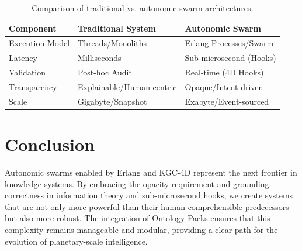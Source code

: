 \begin{table}[h]
\centering
\begin{tabular}{|l|l|l|}
\hline
\textbf{Component} & \textbf{Traditional System} & \textbf{Autonomic Swarm} \\
\hline
Execution Model & Threads/Monoliths & Erlang Processes/Swarm \\
Latency & Milliseconds & Sub-microsecond (Hooks) \\
Validation & Post-hoc Audit & Real-time (4D Hooks) \\
Transparency & Explainable/Human-centric & Opaque/Intent-driven \\
Scale & Gigabyte/Snapshot & Exabyte/Event-sourced \\
\hline
\end{tabular}
\caption{Comparison of traditional vs. autonomic swarm architectures.}
\end{table}

\section{Conclusion}

Autonomic swarms enabled by Erlang and KGC-4D represent the next frontier in knowledge systems. By embracing the opacity requirement and grounding correctness in information theory and sub-microsecond hooks, we create systems that are not only more powerful than their human-comprehensible predecessors but also more robust. The integration of Ontology Packs ensures that this complexity remains manageable and modular, providing a clear path for the evolution of planetary-scale intelligence.

